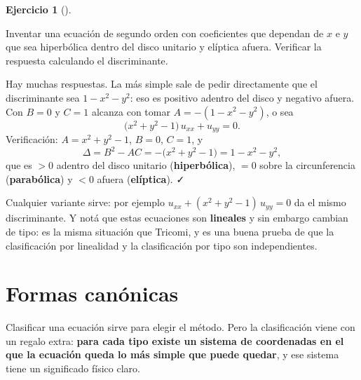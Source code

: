 \documentclass[
  spanish,
  a4paper,
]{scrbook}
\theoremstyle{definition}
\theoremstyle{plain}
\theoremstyle{definition}
\theoremstyle{plain}
\theoremstyle{definition}
\newtheorem{exercise}{Ejercicio}[chapter]
\theoremstyle{remark}
\begin{document}
\begin{exercise}[]\protect\hypertarget{exr-cambio-tipo}{}\label{exr-cambio-tipo}

Inventar una ecuación de segundo orden con coeficientes que dependan de
\(x\) e \(y\) que sea hiperbólica dentro del disco unitario y elíptica
afuera. Verificar la respuesta calculando el discriminante.

\end{exercise}

\begin{tcolorbox}[enhanced jigsaw, arc=.35mm, bottomrule=.15mm, bottomtitle=1mm, breakable, colback=white, colbacktitle=quarto-callout-tip-color!10!white, colframe=quarto-callout-tip-color-frame, coltitle=black, left=2mm, leftrule=.75mm, opacityback=0, opacitybacktitle=0.6, rightrule=.15mm, title=\textcolor{quarto-callout-tip-color}{\faLightbulb}\hspace{0.5em}{Solución}, titlerule=0mm, toprule=.15mm, toptitle=1mm]

Hay muchas respuestas. La más simple sale de pedir directamente que el
discriminante sea \(1-x^2-y^2\): eso es positivo adentro del disco y
negativo afuera. Con \(B=0\) y \(C=1\) alcanza con tomar
\(A = -(1-x^2-y^2)\), o sea \[
\big(x^2+y^2-1\big)\,u_{xx} + u_{yy} = 0 .
\] Verificación: \(A = x^2+y^2-1\), \(B=0\), \(C=1\), y
\[\Delta = B^2 - AC = -\big(x^2+y^2-1\big) = 1-x^2-y^2,\] que es \(>0\)
adentro del disco unitario (\textbf{hiperbólica}), \(=0\) sobre la
circunferencia (\textbf{parabólica}) y \(<0\) afuera
(\textbf{elíptica}). ✓

Cualquier variante sirve: por ejemplo
\(u_{xx} + (x^2+y^2-1)\,u_{yy} = 0\) da el mismo discriminante. Y notá
que estas ecuaciones son \textbf{lineales} y sin embargo cambian de
tipo: es la misma situación que Tricomi, y es una buena prueba de que la
clasificación por linealidad y la clasificación por tipo son
independientes.

\end{tcolorbox}

\section{Formas canónicas}\label{sec-formas-canonicas}

Clasificar una ecuación sirve para elegir el método. Pero la
clasificación viene con un regalo extra: \textbf{para cada tipo existe
un sistema de coordenadas en el que la ecuación queda lo más simple que
puede quedar}, y ese sistema tiene un significado físico claro.
\end{document}
